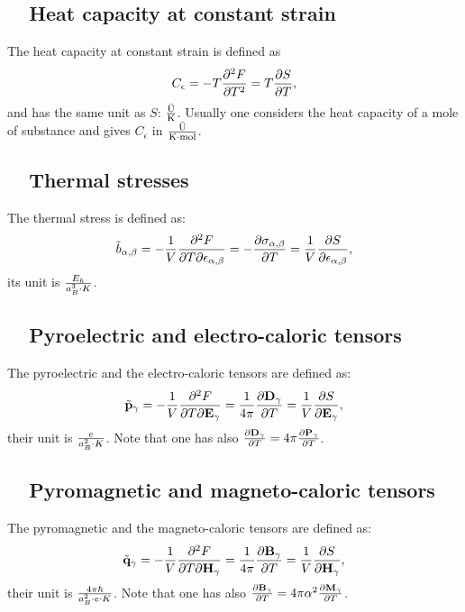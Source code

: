 \documentclass[12pt,a4paper,twoside]{report}
\begin{document}
{\subsection{\color{web-blue}\ \ Heat capacity at constant strain}
The heat capacity at constant strain is defined as
\begin{equation}
C_\epsilon= - T {\partial^2 F \over \partial T^2} = 
T {\partial S \over \partial T},
\end{equation}
and has the same unit as $S$: ${\rm \bar U}\over {\rm K}$. Usually 
one considers the heat
capacity of a mole of substance and gives $C_\epsilon$ in 
${{\rm \bar U}\over {\rm K} \cdot {\rm mol}}$.

\subsection{\color{web-blue}\ \ Thermal stresses}
The thermal stress is defined as:
\begin{equation}
\tilde b_{\alpha,\beta} = 
-{1\over V} {\partial^2 F \over \partial T
\partial \epsilon_{\alpha,\beta}}=
-{\partial \sigma_{\alpha,\beta} \over \partial T}=
{1\over V} {\partial S \over \partial {\bf \epsilon}_{\alpha,\beta}},
\end{equation}
its unit is ${E_h \over a_B^3 \cdot K}$.

\subsection{\color{web-blue}\ \ Pyroelectric and electro-caloric tensors}
The pyroelectric and the electro-caloric tensors are defined as:
\begin{equation}
\tilde {\bf p}_\gamma =
-{1\over V} {\partial^2 F \over \partial T
\partial {\bf E}_\gamma}=
{1\over 4 \pi} {\partial {\bf D}_\gamma \over \partial T}=
{1\over V} {\partial S \over \partial {\bf E}_{\gamma}},
\end{equation}
their unit is ${e \over a_B^2 \cdot K}$. Note that one has also
${\partial {\bf D}_\gamma \over \partial T}=
4 \pi {\partial {\bf P}_\gamma \over \partial T}$. 

\subsection{\color{web-blue}\ \ Pyromagnetic and magneto-caloric tensors}
The pyromagnetic and the magneto-caloric tensors are defined as:
\begin{equation}
\tilde {\bf q}_\gamma = 
-{1\over V} {\partial^2 F \over \partial T
\partial {\bf H}_\gamma}=
{1\over 4 \pi} {\partial {\bf B}_\gamma \over \partial T}=
{1\over V} {\partial S \over \partial {\bf H}_{\gamma}},
\end{equation}
their unit is ${4 \pi \hbar \over a_B^2 \cdot e \cdot K}$. 
Note that one has also
${\partial {\bf B}_\gamma \over \partial T}= 4 \pi \alpha^2
{\partial {\bf M}_\gamma \over \partial T}$.

}
\end{document}
